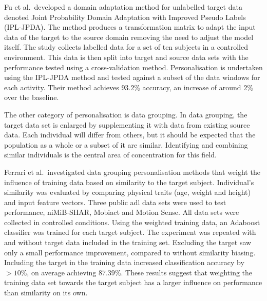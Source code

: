 Fu et al.~developed a domain adaptation method for unlabelled target data denoted Joint Probability Domain Adaptation with Improved Pseudo Labels (IPL-JPDA). The method produces a transformation matrix to adapt the input data of the target to the source domain removing the need to adjust the model itself. The study collects labelled data for a set of ten subjects in a controlled environment. This data is then split into target and source data sets with the performance tested using a cross-validation method. Personalisation is undertaken using the IPL-JPDA method and tested against a subset of the data windows for each activity. Their method achieves $93.2\%$ accuracy, an increase of around $2\%$ over the baseline.\cite{Fu2021}


The other category of personalisation is data grouping. In data grouping, the target data set is enlarged by supplementing it with data from existing source data. Each individual will differ from others, but it should be expected that the population as a whole or a subset of it are similar\cite{Schneider2021, Nguyen2021}. Identifying and combining similar individuals is the central area of concentration for this field.

Ferrari et al.~investigated data grouping personalisation methods that weight the influence of training data based on similarity to the target subject. Individual's similarity was evaluated by comparing physical traits (age, weight and height) and input feature vectors. Three public \acrfull{adl} data sets were used to test performance, niMiB-SHAR\cite{Micucci2017}, Mobiact\cite{Vavoulas2016} and Motion Sense\cite{Katevas2014}. All data sets were collected in controlled conditions. Using the weighted training data, an Adaboost classifier was trained for each target subject. The experiment was repeated with and without target data included in the training set. Excluding the target saw only a small performance improvement, compared to without similarity biasing. Including the target in the training data increased classification accuracy by $>10\%$, on average achieving $87.39\%$. These results suggest that weighting the training data set towards the target subject has a larger influence on performance than similarity on its own.\cite{Ferrari2020}

